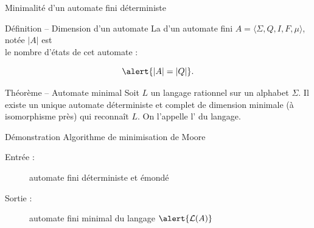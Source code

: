 
\begingroup

\begin{frame}{Minimalité d'un automate fini déterministe}
  \begin{block}{Définition -- Dimension d'un automate}
    La  d'un automate fini $A=\langle \Sigma, Q, I, F, \mu \rangle$,
    notée \alert{$|A|$} est \\ le nombre d'états de cet automate :

    $$\alert{|A| = |Q|}.$$
  \end{block}

  \begin{block}{Théorème -- Automate minimal}
    Soit $L$ un langage rationnel sur un alphabet $\Sigma$.
    Il existe \alert{un unique} automate déterministe et complet
    \alert{de dimension minimale} (à isomorphisme près) qui reconnaît $L$. 
    On l'appelle l’ du langage.
  \end{block}

  \begin{block}{Démonstration}
    Algorithme de minimisation de Moore
    \begin{description}
    \item [Entrée :] automate fini \alert{déterministe} et \alert{émondé}  
    \item [Sortie :] automate fini minimal du langage $\alert{\mathcal{L}(A)}$
    \end{description}
  \end{block}

\end{frame}

\endgroup
\endinput
